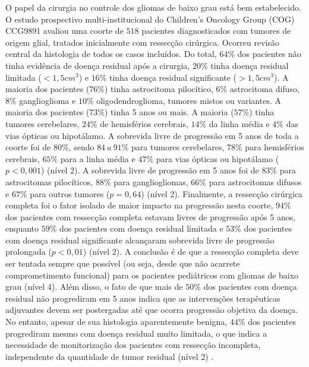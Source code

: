 \documentclass[11pt,a4paper,oldfontcommands]{memoir}
\begin{document}
O papel da cirurgia no controle dos gliomas de baixo grau está bem estabelecido. O estudo prospectivo multi-institucional do Children’s Oncology Group (COG) CCG9891 avaliou uma coorte de \(518\) pacientes diagnosticados com tumores de origem glial, tratados inicialmente com ressecção cirúrgica. Ocorreu revisão central da histologia de todos os casos incluídos. Do total, \(64\%\) dos pacientes não tinha evidência de doença residual após a cirurgia, \(20\%\) tinha doença residual limitada (\(< 1,5 cm^3\)) e \(16\%\) tinha doença residual significante (\(> 1,5 cm^3\)). A maioria dos pacientes (\(76\%\)) tinha astrocitoma pilocítico, \(6\%\) astrocitoma difuso, \(8\%\) ganglioglioma e \(10\%\) oligodendroglioma, tumores mistos ou variantes. A maioria dos pacientes (\(73\%\)) tinha 5 anos ou mais. A maioria (\(57\%\)) tinha tumores cerebelares, \(24\%\) de hemisférios cerebrais, \(14\%\) da linha média e \(4\%\) das vias ópticas ou hipotálamo. A sobrevida livre de progressão em 5 anos de toda a coorte foi de \(80\%\), sendo \(84 \:a\: 91\%\) para tumores cerebelares, \(78\%\) para hemisférios cerebrais, \(65\%\) para a linha média e \(47\%\) para vias ópticas ou hipotálamo (\(p<0,001\)) (nível 2). A sobrevida livre de progressão em 5 anos foi de \(83\%\) para astrocitomas pilocíticos, \(88\%\) para gangliogliomas, \(66\%\) para astrocitomas difusos e \(67\%\) para outros tumores (\(p=0,64\)) (nível 2). Finalmente, a ressecção cirúrgica completa foi o fator isolado de maior impacto na progressão nesta coorte, \(94\%\) dos pacientes com ressecção completa estavam livres de progressão após 5 anos, enquanto \(59\%\) dos pacientes com doença residual limitada e \(53\%\) dos pacientes com doença residual significante alcançaram sobrevida livre de progressão prolongada (\(p<0,01\)) (nível 2). A conclusão é de que a ressecção completa deve ser tentada sempre que possível (ou seja, desde que não acarrete comprometimento funcional) para os pacientes pediátricos com gliomas de baixo grau (nível 4). Além disso, o fato de que mais de \(50\%\) dos pacientes com doença residual não progrediram em 5 anos indica que as intervenções terapêuticas adjuvantes devem ser postergadas até que ocorra progressão objetiva da doença. No entanto, apesar de sua histologia aparentemente benigna, \(44\%\) dos pacientes progrediram mesmo com doença residual muito limitada, o que indica a necessidade de monitorização dos pacientes com ressecção incompleta, independente da quantidade de tumor residual (nível 2) \cite{wisof}.
\end{document}
